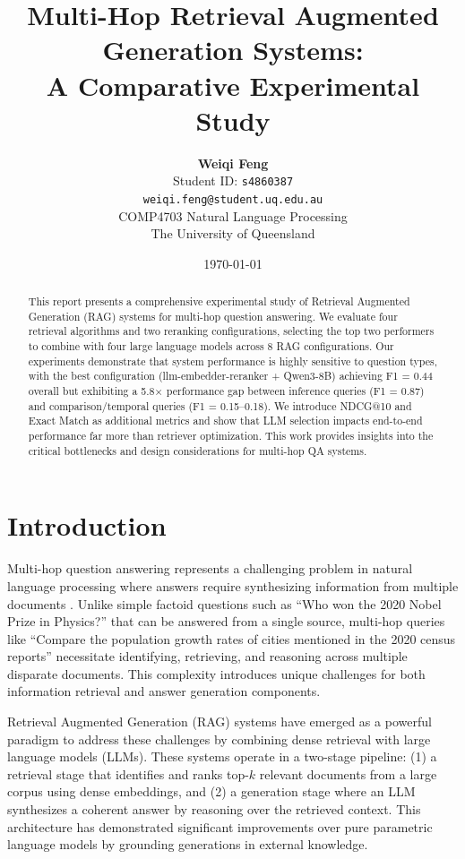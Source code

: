 \documentclass[10pt,twocolumn]{article}
\title{\vspace{-2em}\textbf{Multi-Hop Retrieval Augmented Generation Systems: \\
A Comparative Experimental Study}\vspace{1em}}
\author{
    \textbf{\large Weiqi Feng}\\[-0.2em]
    \small Student ID: \texttt{s4860387}\\[-0.2em]
    \small \texttt{weiqi.feng@student.uq.edu.au}\\[-0.2em]
    \small COMP4703 Natural Language Processing\\[-0.2em]
    \small The University of Queensland
}
\date{\today}
\begin{document}
\maketitle
\vspace{-1em}

\begin{abstract}
    This report presents a comprehensive experimental study of Retrieval Augmented Generation (RAG) systems for multi-hop question answering. We evaluate four retrieval algorithms and two reranking configurations, selecting the top two performers to combine with four large language models across 8 RAG configurations. Our experiments demonstrate that system performance is highly sensitive to question types, with the best configuration (llm-embedder-reranker + Qwen3-8B) achieving F1 = 0.44 overall but exhibiting a 5.8× performance gap between inference queries (F1 = 0.87) and comparison/temporal queries (F1 = 0.15--0.18). We introduce NDCG@10 and Exact Match as additional metrics and show that LLM selection impacts end-to-end performance far more than retriever optimization. This work provides insights into the critical bottlenecks and design considerations for multi-hop QA systems.
\end{abstract}

\vspace{-0.5em}

\section{Introduction}

Multi-hop question answering represents a challenging problem in natural language processing where answers require synthesizing information from multiple documents \cite{yangHotpotQADatasetDiverse2018}. Unlike simple factoid questions such as ``Who won the 2020 Nobel Prize in Physics?'' that can be answered from a single source, multi-hop queries like ``Compare the population growth rates of cities mentioned in the 2020 census reports'' necessitate identifying, retrieving, and reasoning across multiple disparate documents. This complexity introduces unique challenges for both information retrieval and answer generation components.

Retrieval Augmented Generation (RAG) systems have emerged as a powerful paradigm to address these challenges by combining dense retrieval with large language models (LLMs). These systems operate in a two-stage pipeline: (1) a retrieval stage that identifies and ranks top-$k$ relevant documents from a large corpus using dense embeddings, and (2) a generation stage where an LLM synthesizes a coherent answer by reasoning over the retrieved context. This architecture has demonstrated significant improvements over pure parametric language models by grounding generations in external knowledge.
\end{document}
